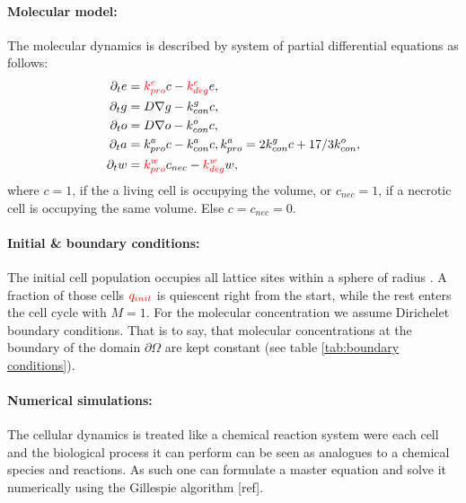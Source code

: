 \documentclass[10pt,letterpaper]{article}
\newcommand{\nj}[1]{{\color{blue}#1}}
\begin{document}
\paragraph{Molecular model:} The molecular dynamics is described by system of partial differential equations as follows:
\begin{align}
	\partial_{t} e &= {\color{red}{k^{e}_{pro}}} c - {\color{red}{k^{e}_{deg}}} e,\\
	\partial_{t} g &= D \nabla g - k^{g}_{con} c,\\
	\partial_{t} o &= D \nabla o - k^{o}_{con} c,\\
	\partial_{t} a &=k^{a}_{pro}c - k^{a}_{con} c, k^{a}_{pro} =  2k^{g}_{con} c + 17/3 k^{o}_{con},\\
	\partial_{t} w &= {\color{red}{k^{w}_{pro}}} c_{nec} - {\color{red}{k^{w}_{deg}}} w,\\
\end{align}
where $c=1$, if the a living cell is occupying the volume, or $c_{nec}=1$, if a necrotic cell is occupying the same volume. Else $c=c_{nec}=0$.

\paragraph{Initial \& boundary conditions:}
The initial cell population occupies all lattice sites within a sphere of radius {}. A fraction of those cells $\color{red}{q_{init}}$ is quiescent right from the start, while the rest enters the cell cycle with $M=1$. For the molecular concentration we assume Dirichelet boundary conditions. That is to say, that molecular concentrations at the boundary of the domain $\partial \Omega$ are kept constant (see table \ref{tab:boundary conditions}).

\paragraph{Numerical simulations:}
The cellular dynamics is treated like a chemical reaction system were each cell and the biological process it can perform can be seen as analogues to a chemical species and reactions. As such one can formulate a master equation and solve it numerically using the Gillespie algorithm \nj{[ref]}.  
\end{document}
